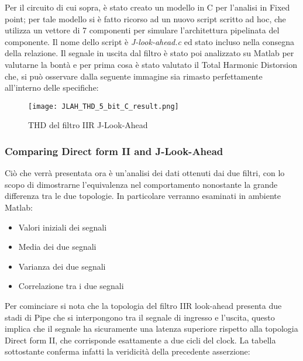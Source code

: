 Per il circuito di cui sopra, è stato creato un modello in C per l'analisi in Fixed point; per tale modello si è fatto ricorso ad un nuovo script scritto ad hoc, che utilizza un vettore di 7 componenti per simulare l'architettura pipelinata del componente. Il nome dello script è \textit{J-look-ahead.c} ed stato incluso nella consegna della relazione. Il segnale in uscita dal filtro è stato poi analizzato su Matlab per valutarne la bontà e per prima cosa è stato valutato il Total Harmonic Distorsion che, si può osservare dalla seguente immagine sia rimasto perfettamente all'interno delle specifiche:

\begin{figure}[H]
\centering
\texttt{[image: JLAH\_THD\_5\_bit\_C\_result.png]}
\caption{THD del filtro IIR J-Look-Ahead}
\label{fig:THD_5_bit_IIR_JLA}
\end{figure}

\subsubsection{Comparing Direct form II and J-Look-Ahead}
Ciò che verrà presentata ora è un'analisi dei dati ottenuti dai due filtri, con lo scopo di dimostrarne l'equivalenza nel comportamento nonostante la grande differenza tra le due topologie. In particolare verranno esaminati in ambiente Matlab:

\begin{itemize}
\item Valori iniziali dei segnali
\item Media dei due segnali
\item Varianza dei due segnali
\item Correlazione tra i due segnali
\end{itemize}

Per cominciare si nota che la topologia del filtro IIR look-ahead presenta due stadi di Pipe che si interpongono tra il segnale di ingresso e l'uscita, questo implica che il segnale ha sicuramente una latenza superiore rispetto alla topologia Direct form II, che corrisponde esattamente a due cicli del clock. La tabella sottostante conferma infatti la veridicità della precedente asserzione:



